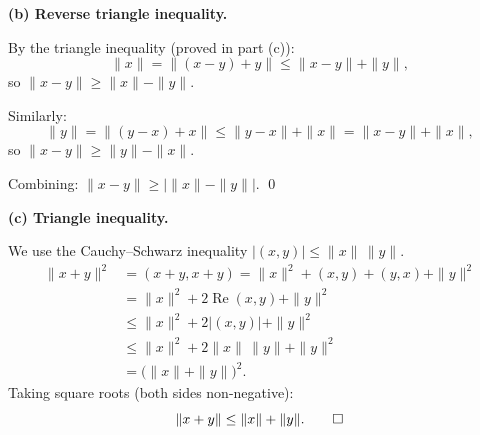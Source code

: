 \documentclass[12pt]{article}
\begin{document}
\bigskip
\textbf{(b) Reverse triangle inequality.}

By the triangle inequality (proved in part (c)):
\[
\|x\| = \|(x - y) + y\| \leq \|x - y\| + \|y\|,
\]
so $\|x - y\| \geq \|x\| - \|y\|$.

Similarly:
\[
\|y\| = \|(y - x) + x\| \leq \|y - x\| + \|x\| = \|x - y\| + \|x\|,
\]
so $\|x - y\| \geq \|y\| - \|x\|$.

Combining: $\|x - y\| \geq \big|\|x\| - \|y\|\big|$. \qed

\bigskip
\textbf{(c) Triangle inequality.}

We use the Cauchy--Schwarz inequality $|(x,y)| \leq \|x\|\,\|y\|$.
\begin{align*}
\|x + y\|^2 &= (x+y, x+y) = \|x\|^2 + (x,y) + (y,x) + \|y\|^2 \\
&= \|x\|^2 + 2\operatorname{Re}(x,y) + \|y\|^2 \\
&\leq \|x\|^2 + 2|(x,y)| + \|y\|^2 \\
&\leq \|x\|^2 + 2\|x\|\,\|y\| + \|y\|^2 \\
&= \bigl(\|x\| + \|y\|\bigr)^2.
\end{align*}
Taking square roots (both sides non-negative):
\[
\|x + y\| \leq \|x\| + \|y\|. \qed
\]
\end{document}
